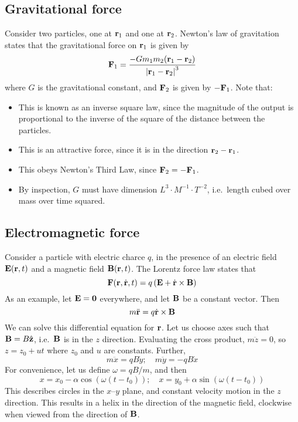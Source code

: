 \subsection{Gravitational force}
Consider two particles, one at \(\vb r_1\) and one at \(\vb r_2\).
Newton's law of gravitation states that the gravitational force on \(\vb r_1\) is given by
\[
	\vb F_1 = \frac{- G m_1 m_2 (\vb r_1 - \vb r_2)}{\abs{\vb r_1 - \vb r_2}^3}
\]
where \(G\) is the gravitational constant, and \(\vb F_2\) is given by \(-\vb F_1\).
Note that:
\begin{itemize}
	\item This is known as an inverse square law, since the magnitude of the output is proportional to the inverse of the square of the distance between the particles.
	\item This is an attractive force, since it is in the direction \(\vb r_2 - \vb r_1\).
	\item This obeys Newton's Third Law, since \(\vb F_2 = - \vb F_1\).
	\item By inspection, \(G\) must have dimension \(L^3 \cdot M^{-1} \cdot T^{-2}\), i.e.\ length cubed over mass over time squared.
\end{itemize}

\subsection{Electromagnetic force}
Consider a particle with electric charce \(q\), in the presence of an electric field \(\vb E(\vb r, t)\) and a magnetic field \(\vb B(\vb r, t)\).
The Lorentz force law states that
\[
	\vb F(\vb r, \dot{\vb r}, t) = q\left( \vb E + \dot{\vb r} \times \vb B \right)
\]
As an example, let \(\vb E = \vb 0\) everywhere, and let \(\vb B\) be a constant vector.
Then
\[
	m \ddot{\vb r} = q \dot{\vb r} \times \vb B
\]
We can solve this differential equation for \(\vb r\).
Let us choose axes such that \(\vb B = B \hat{\vb{z}}\), i.e.\ \(\vb B\) is in the \(z\) direction.
Evaluating the cross product, \(m \ddot{z} = 0\), so \(z = z_0 + ut\) where \(z_0\) and \(u\) are constants.
Further,
\[
	m \ddot x = qB\dot y;\quad m \ddot y = -qB\dot x
\]
For convenience, let us define \(\omega = qB/m\), and then
\[
	x = x_0 - \alpha \cos(\omega(t - t_0));\quad x = y_0 + \alpha \sin(\omega(t - t_0))
\]
This describes circles in the \(x\)--\(y\) plane, and constant velocity motion in the \(z\) direction.
This results in a helix in the direction of the magnetic field, clockwise when viewed from the direction of \(\vb B\).
